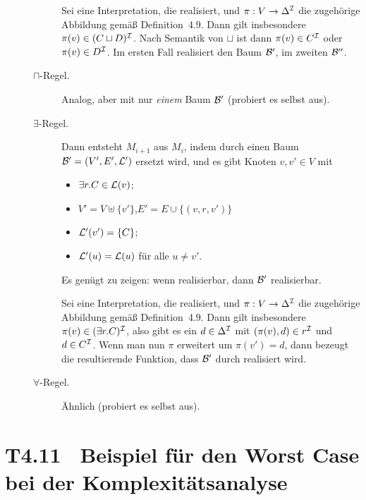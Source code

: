 \documentclass[fontsize=11pt, twoside=false, numbers=autoenddot]{scrbook}
\begin{document}
\begin{beweis}
\begin{description}
\begin{description}
          Sei \Imc eine Interpretation, die \Bmc realisiert,
          und $\pi : V \to \Delta^\mathcal{I}$ die zugehörige Abbildung gemäß Definition~4.9.
          Dann gilt insbesondere $\pi(v) \in (C \sqcup D)^\mathcal{I}$.
          Nach Semantik von $\sqcup$ ist dann $\pi(v) \in C^\mathcal{I}$ oder $\pi(v) \in D^\mathcal{I}$.
          Im ersten Fall realisiert \Imc den Baum $\mathcal{B}'$, im zweiten $\mathcal{B}''$.
        \item[{\boldmath $\sqcap$-Regel.}]
          Analog, aber mit nur \emph{einem} Baum $\mathcal{B}'$ (probiert es selbst aus).
        \item[{\boldmath $\exists$-Regel.}]
          Dann entsteht $M_{i+1}$ aus $M_i$,
          indem \Bmc durch einen Baum $\mathcal{B}' = (V',E',\mathcal{L}')$ ersetzt wird,
          und es gibt Knoten $v,v' \in V$ mit
          \begin{itemize}
            \item
              $\exists r.C \in \mathcal{L}(v)$;
            \item
              $V' = V \uplus \{v'\}$,\quad $E' = E \cup \{(v,r,v')\}$
            \item
              $\mathcal{L}'(v') = \{C\}$;
            \item
              $\mathcal{L}'(u) = \mathcal{L}(u)$ für alle $u \neq v'$.
          \end{itemize}
          Es genügt zu zeigen: wenn \Bmc realisierbar, dann $\mathcal{B}'$ realisierbar.

          Sei \Imc eine Interpretation, die \Bmc realisiert,
          und $\pi : V \to \Delta^\mathcal{I}$ die zugehörige Abbildung gemäß Definition~4.9.
          Dann gilt insbesondere $\pi(v) \in (\exists r.C)^\mathcal{I}$,
          also gibt es ein $d \in \Delta^\mathcal{I}$ mit $(\pi(v),d) \in r^\mathcal{I}$
          und $d \in C^\mathcal{I}$.
          Wenn man nun $\pi$ erweitert um $\pi(v') = d$,
          dann bezeugt die resultierende Funktion,
          dass $\mathcal{B}'$ durch \Imc realisiert wird.
        \item[{\boldmath $\forall$-Regel.}]
          Ähnlich (probiert es selbst aus).
          \qedhere
      \end{description}
  \end{description}
\end{beweis}

\section*{T4.11~ Beispiel für den Worst Case bei der Komplexitätsanalyse}
\end{document}
